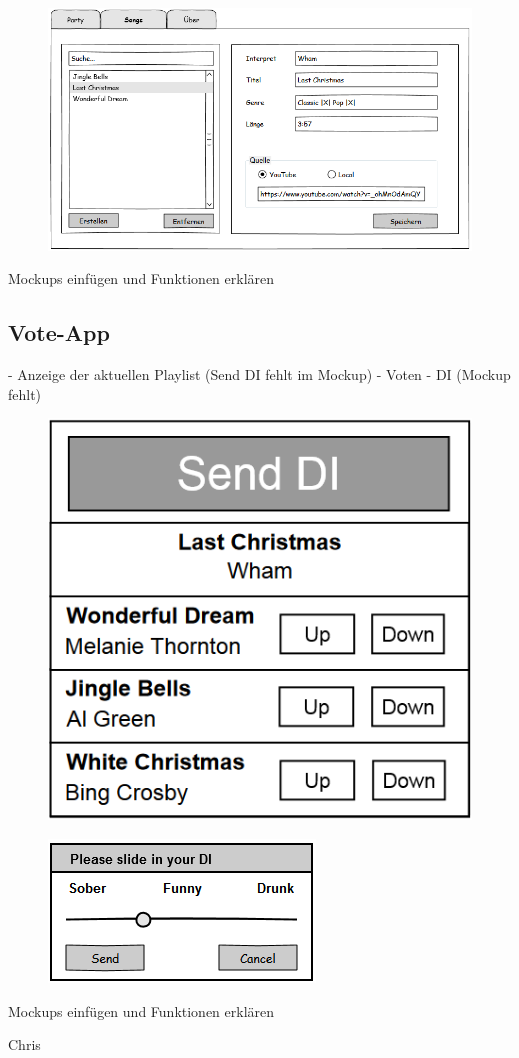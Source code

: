 \begin{figure}[H]
\centering
\includegraphics[width=0.95\linewidth]{Bilder/MockSongVerwaltung}
\caption{}
\label{fig:MockSongVerwaltung}
\end{figure}

  
Mockups einfügen und Funktionen erklären

\subsection{Vote-App}
- Anzeige der aktuellen Playlist (Send DI fehlt im Mockup)
- Voten
- DI (Mockup fehlt)

\begin{figure}[H]
\centering
\includegraphics[width=0.6\linewidth]{Bilder/MockPartyPeopleClient}
\caption{}
\label{fig:MockPartyPeopleClient}
\end{figure}

\begin{figure}[H]
\centering
\includegraphics[width=0.7\linewidth]{Bilder/MockDiSlider}
\caption{}
\label{fig:MockDiSlider}
\end{figure}



Mockups einfügen und Funktionen erklären

Chris